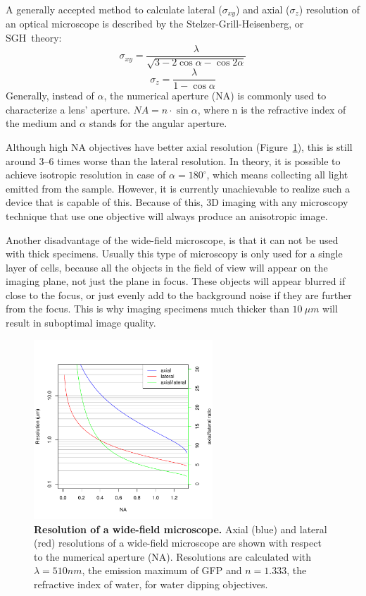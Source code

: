 \documentclass{diploma_style}
\begin{document}
A generally accepted method to calculate lateral ($\sigma_{xy}$) and axial ($\sigma_{z}$) resolution of an optical microscope is described by the Stelzer-Grill-Heisenberg, or SGH~theory\cite{grill_method_1999, stelzer_uncertainty_2000}:
\begin{equation} \label{eq:latres}
\sigma_{xy}=\frac{\lambda}{\sqrt{3-2 \cos \alpha - \cos 2 \alpha}}
\end{equation}
\begin{equation} \label{eq:axres}
\sigma_z = \frac{\lambda}{1-\cos \alpha}
\end{equation}
Generally, instead of $\alpha$, the numerical aperture (NA) is commonly used to characterize a lens' aperture. 
$NA=n\cdot \sin \alpha$, where n is the refractive index of the medium and $\alpha$ stands for the angular aperture.

Although high NA objectives have better axial resolution (Figure~\ref{fig:resolution}), this is still around 3--6 times worse than the lateral resolution. In theory, it is possible to achieve isotropic resolution in case of $\alpha = 180^\circ$, which means collecting all light emitted from the sample. However, it is currently unachievable to realize such a device that is capable of this. Because of this, 3D imaging with any microscopy technique that use one objective will always produce an anisotropic image.

Another disadvantage of the wide-field microscope, is that it can not be used with thick specimens. Usually this type of microscopy is only used for a single layer of cells, because all the objects in the field of view will appear on the imaging plane, not just the plane in focus. These objects will appear blurred if close to the focus, or just evenly add to the background noise if they are further from the focus. This is why imaging specimens much thicker than $10\ \mu m$ will result in suboptimal image quality.

\begin{figure}[htpb]
	\centering
	\includegraphics[width=0.6\textwidth]{figures/1_introduction/resolution}
	\caption{\textbf{Resolution of a wide-field microscope.} Axial (blue) and lateral (red) resolutions of a wide-field microscope are shown with respect to the numerical aperture (NA). Resolutions are calculated with $\lambda =510nm$, the emission maximum of GFP and $n=1.333$, the refractive index of water, for water dipping objectives.}
	\label{fig:resolution}
\end{figure}
\end{document}
